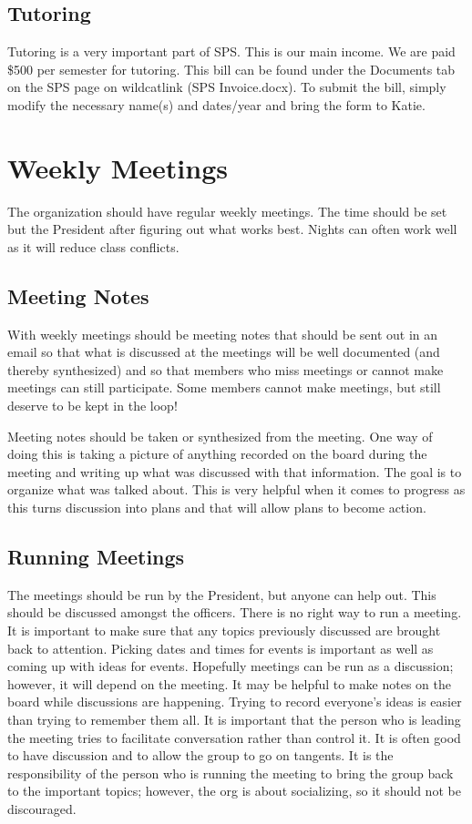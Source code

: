 \documentclass[12pt,epsfig]{article}
\begin{document}
\subsection{Tutoring}
Tutoring is a very important part of SPS. This is our main income. We are paid \$500 per semester for tutoring. This bill can be found under the Documents tab on the SPS page on wildcatlink (SPS Invoice.docx). To submit the bill, simply modify the necessary name(s) and dates/year and bring the form to Katie. 


\section{Weekly Meetings}
The organization should have regular weekly meetings. The time should be set but the President after figuring out what works best. Nights can often work well as it will reduce class conflicts. 

\subsection{Meeting Notes}
With weekly meetings should be meeting notes that should be sent out in an email so that what is discussed at the meetings will be well documented (and thereby synthesized) and so that members who miss meetings or cannot make meetings can still participate. Some members cannot make meetings, but still deserve to be kept in the loop!

Meeting notes should be taken or synthesized from the meeting. One way of doing this is taking a picture of anything recorded on the board during the meeting and writing up what was discussed with that information. The goal is to organize what was talked about. This is very helpful when it comes to progress as this turns discussion into plans and that will allow plans to become action.

\subsection{Running Meetings}
The meetings should be run by the President, but anyone can help out. This should be discussed amongst the officers. There is no right way to run a meeting. It is important to make sure that any topics previously discussed are brought back to attention. Picking dates and times for events is important as well as coming up with ideas for events. Hopefully meetings can be run as a discussion; however, it will depend on the meeting. It may be helpful to make notes on the board while discussions are happening. Trying to record everyone's ideas is easier than trying to remember them all. It is important that the person who is leading the meeting tries to facilitate conversation rather than control it. It is often good to have discussion and to allow the group to go on tangents. It is the responsibility of the person who is running the meeting to bring the group back to the important topics; however, the org is about socializing, so it should not be discouraged.
\end{document}
